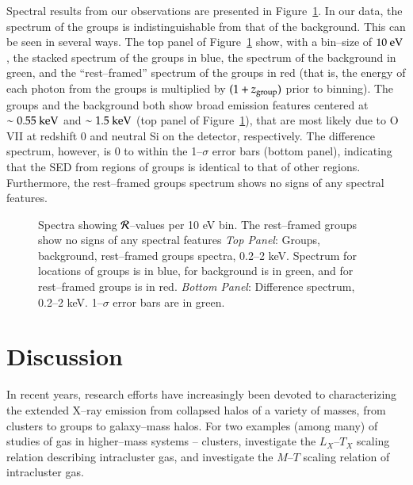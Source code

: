 Spectral results from our observations are presented in
Figure~\ref{groups_fig:spec}.  In our data, the spectrum of the groups
is indistinguishable from that of the background.  This can be seen in
several ways.  The top panel of Figure~\ref{groups_fig:spec} show,
with a bin--size of $10 {\rm~eV}$, the stacked spectrum of the groups
in blue, the spectrum of the background in green, and the
``rest--framed'' spectrum of the groups in red (that is, the energy of
each photon from the groups is multiplied by $(1+z_{\rm group})$ prior
to binning).  The groups and the background both show broad emission
features centered at $\sim 0.55 {\rm~keV}$ and $\sim 1.5 {\rm~keV}$
(top panel of Figure~\ref{groups_fig:spec}), that are most likely due
to O VII at redshift 0 and neutral Si on the detector, respectively.
The difference spectrum, however, is 0 to within the 1--$\sigma$ error
bars (bottom panel), indicating that the SED from regions of groups is
identical to that of other regions.  Furthermore, the rest--framed
groups spectrum shows no signs of any spectral features.

\begin{figure}[p]
\caption[Spectra showing $\R$--values per 10 eV bin.]{Spectra showing
$\R$--values per 10 eV bin.  The rest--framed groups show no signs of
any spectral features {\it Top Panel}: Groups, background,
rest--framed groups spectra, 0.2--2 keV.  Spectrum for locations of
groups is in blue, for background is in green, and for rest--framed
groups is in red.  {\it Bottom Panel}: Difference spectrum, 0.2--2
keV.  1--$\sigma$ error bars are in green.}
\label{groups_fig:spec}
\end{figure}
\afterpage{\clearpage}

\section{Discussion}
\label{groups_sec:disc}
In recent years, research efforts have increasingly been devoted to
characterizing the extended X--ray emission from collapsed halos of a
variety of masses, from clusters to groups to galaxy--mass halos.  For
two examples (among many) of studies of gas in higher--mass systems --
clusters, \citet*{akahori+masai2005} investigate the $L_X$--$T_X$
scaling relation describing intracluster gas, and
\citet*{arnaud_et_al2005} investigate the $M$--$T$ scaling relation of
intracluster gas.

